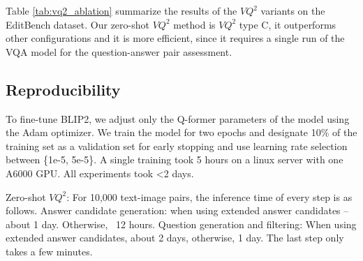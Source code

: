 \documentclass{article}
\begin{document}
Table \ref{tab:vq2_ablation} summarize the results of the $VQ^2$ variants on the EditBench dataset. Our zero-shot $VQ^2$ method is $VQ^2$ type C, it outperforms other configurations and it is more efficient, since it requires a single run of the VQA model for the question-answer pair assessment.

\begin{table}[!h]
\centering
\caption{Comparing $VQ^2$ configurations on all EditBench categories}
\label{tab:vq2_ablation}
\end{table}

\subsection{Reproducibility}
\label{sec:reproducibility}
To fine-tune BLIP2, we adjust only the Q-former parameters of the model using the Adam optimizer. We train the model for two epochs and designate 10\% of the training set as a validation set for early stopping and use learning rate selection between \{1e-5, 5e-5\}. A single training took 5 hours on a linux server with one A6000 GPU. All experiments took <2 days.

Zero-shot $VQ^2$: For 10,000 text-image pairs, the inference time of every step is as follows.
Answer candidate generation: when using extended answer candidates -- about 1 day. Otherwise, ~12 hours.
Question generation and filtering: When using extended answer candidates, about 2 days, otherwise, 1 day.
The last step only takes a few minutes.


 
\end{document}
